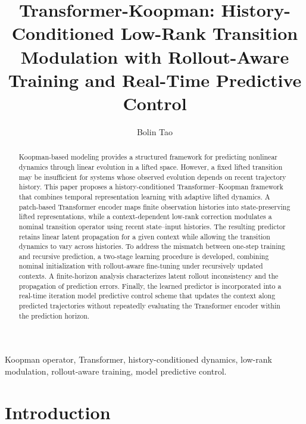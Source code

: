 \documentclass[journal]{IEEEtran}
\begin{document}
\title{Transformer-Koopman: History-Conditioned Low-Rank Transition Modulation with Rollout-Aware Training and Real-Time Predictive Control}

\author{Bolin Tao}


\maketitle

\begin{abstract}
Koopman-based modeling provides a structured framework for predicting nonlinear dynamics through linear evolution in a lifted space. However, a fixed lifted transition may be insufficient for systems whose observed evolution depends on recent trajectory history. This paper proposes a history-conditioned Transformer--Koopman framework that combines temporal representation learning with adaptive lifted dynamics. A patch-based Transformer encoder maps finite observation histories into state-preserving lifted representations, while a context-dependent low-rank correction modulates a nominal transition operator using recent state--input histories. The resulting predictor retains linear latent propagation for a given context while allowing the transition dynamics to vary across histories. To address the mismatch between one-step training and recursive prediction, a two-stage learning procedure is developed, combining nominal initialization with rollout-aware fine-tuning under recursively updated contexts. A finite-horizon analysis characterizes latent rollout inconsistency and the propagation of prediction errors. Finally, the learned predictor is incorporated into a real-time iteration model predictive control scheme that updates the context along predicted trajectories without repeatedly evaluating the Transformer encoder within the prediction horizon.
\end{abstract}

\begin{IEEEkeywords}
Koopman operator, Transformer, history-conditioned dynamics, low-rank modulation, rollout-aware training, model predictive control.
\end{IEEEkeywords}

\section{Introduction}
\label{sec:introduction}
\end{document}

